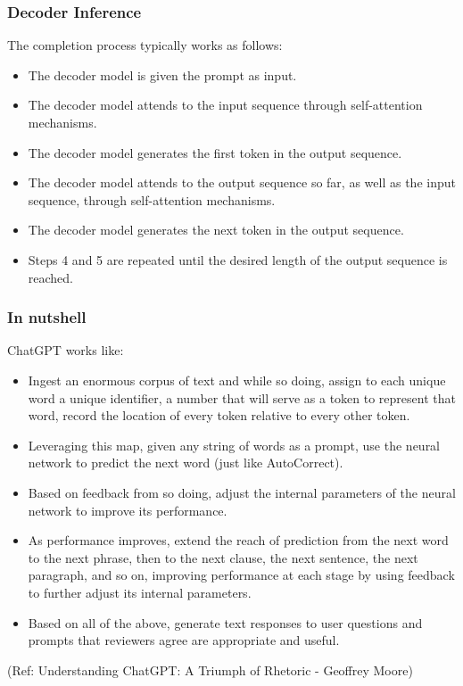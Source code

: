 \begin{frame}[fragile]\frametitle{Decoder Inference}

The completion process typically works as follows:

\begin{itemize}
\item The decoder model is given the prompt as input.
\item The decoder model attends to the input sequence through self-attention mechanisms.
\item The decoder model generates the first token in the output sequence.
\item The decoder model attends to the output sequence so far, as well as the input sequence, through self-attention mechanisms.
\item The decoder model generates the next token in the output sequence.
\item Steps 4 and 5 are repeated until the desired length of the output sequence is reached.
\end{itemize}

\end{frame}

\begin{frame}[fragile]\frametitle{In nutshell}

ChatGPT works like:
\begin{itemize}
\item Ingest an enormous corpus of text and while so doing, assign to each unique word a unique identifier, a number that will serve as a token to represent that word, record the location of every token relative to every other token.
\item Leveraging this map, given any string of words as a prompt, use the neural network to predict the next word (just like AutoCorrect).
\item Based on feedback from so doing, adjust the internal parameters of the neural network to improve its performance.
\item As performance improves, extend the reach of prediction from the next word to the next phrase, then to the next clause, the next sentence, the next paragraph, and so on, improving performance at each stage by using feedback to further adjust its internal parameters.
\item Based on all of the above, generate text responses to user questions and prompts that reviewers agree are appropriate and useful.
\end{itemize}


{\tiny (Ref: Understanding ChatGPT: A Triumph of Rhetoric - Geoffrey Moore)}

\end{frame}

